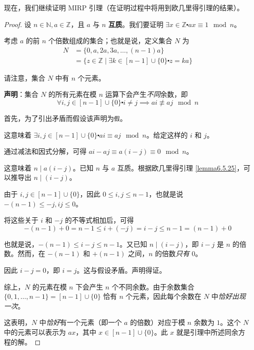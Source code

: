 现在，我们继续证明 MIRP 引理（在证明过程中将用到欧几里得引理的结果）。

\begin{proof}
    设 $n \in \mathbb{N}, a \in \mathbb{Z}$，且 $a$ 与 $n$ \textbf{互质}。我们要证明 $\exists x \in \mathbb{Z} \centerdot ax \equiv 1 \mod n$。

    考虑 $a$ 的前 $n$ 个倍数组成的集合；也就是说，定义集合 $N$ 为
    \begin{align*}
        N &= \{0, a, 2a, 3a, \dots ,(n-1)a\} \\
        &= \{z \in \mathbb{Z} \mid \exists k \in [n - 1] \cup \{0\} \centerdot z = ka\}
    \end{align*}

    请注意，集合 $N$ 中有 $n$ 个元素。

    \textbf{声明}：集合 $N$ 的所有元素在模 $n$ 运算下会产生\emph{不同}余数，即
    \[\forall i, j \in [n-1] \cup \{0\} \centerdot i \ne j \implies ai \not\equiv aj \mod n\]

    首先，为了引出矛盾而假设该声明为\verb|假|。

    这意味着 $\exists i, j \in [n-1] \cup \{0\} \centerdot ai \equiv aj \mod n$。给定这样的 $i$ 和 $j$。

    通过减法和因式分解，可得 $ai - aj \equiv a(i-j) \equiv 0 \mod n$。

    这意味着 $n \mid a(i-j)$。已知 $n$ 与 $a$ 互质。根据欧几里得引理 \ref{lemma6.5.25}，可以推导出 $n \mid (i-j)$。

    由于 $i, j \in [n-1] \cup \{0\}$，因此 $0 \le i, j \le n-1$，也就是说 $-(n-1) \le -j, ij \le 0$。

    将这些关于 $i$ 和 $-j$ 的不等式相加后，可得
    \[-(n-1) + 0 = n-1 \le i + (-j) = i - j \le n - 1 = (n-1) + 0\]

    也就是说，$-(n-1) \le i-j \le n-1$。又已知 $n \mid (i - j)$，即 $i-j$ 是 $n$ 的倍数。然而，在 $-(n-1)$ 和 $+(n-1)$ 之间，$n$ 的倍数\emph{只有} $0$。

    因此 $i-j=0$，即 $i=j$。这与假设矛盾。声明得证。

    综上，$N$ 的元素在模 $n$ 下会产生 $n$ 个不同余数。由于余数集合 $\{0, 1, \dots, n-1\} = [n-1] \cup \{0\}$ 恰有 $n$ 个元素，因此每个余数在 $N$ 中\emph{恰好出现一次}。

    这表明，$N$ 中\emph{恰好}有一个元素（即一个 $a$ 的倍数）对应于模 $n$ 余数为 $1$。这个 $N$ 中的元素可以表示为 $ax$，其中 $x \in [n-1] \cup \{0\}$。此 $x$ 就是引理中所述同余方程的解。
\end{proof}

